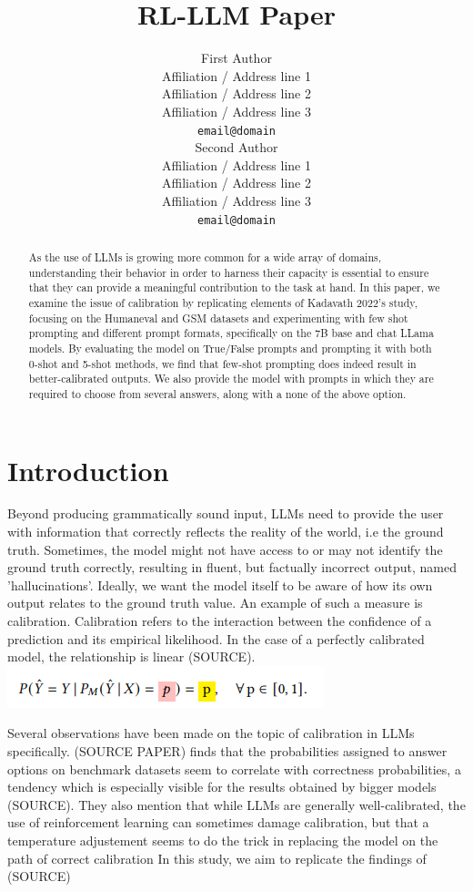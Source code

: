 \documentclass[11pt]{article}
\title{RL-LLM Paper}
\author{First Author \\
  Affiliation / Address line 1 \\
  Affiliation / Address line 2 \\
  Affiliation / Address line 3 \\
  \texttt{email@domain} \\\And
  Second Author \\
  Affiliation / Address line 1 \\
  Affiliation / Address line 2 \\
  Affiliation / Address line 3 \\
  \texttt{email@domain} \\}
\begin{document}
\maketitle
\begin{abstract}
As the use of LLMs is growing more common for a wide array of domains, understanding their behavior in order to harness their capacity is essential to ensure that they can provide a meaningful contribution to the task at hand. In this paper, we examine the issue of calibration by replicating elements of Kadavath 2022's study, focusing on the Humaneval and GSM datasets and experimenting with few shot prompting and different prompt formats, specifically on the 7B base and chat LLama models. By evaluating the model on True/False prompts and prompting it with both 0-shot and 5-shot methods, we find that few-shot prompting does indeed result in better-calibrated outputs. We also provide the model with prompts in which they are required to choose from several answers, along with a none of the above option.
\end{abstract}



\section{Introduction}

Beyond producing grammatically sound input, LLMs need to provide the user with information that correctly reflects the reality of the world, i.e the ground truth. Sometimes, the model might not have access to or may not identify the ground truth correctly, resulting in fluent, but factually incorrect output, named 'hallucinations'. Ideally, we want the model itself to be aware of how its own output relates to the ground truth value. An example of such a measure is calibration. Calibration refers to the interaction between the confidence of a prediction and its empirical likelihood. In the case of a perfectly calibrated model, the relationship is linear (SOURCE). 
\includegraphics{figures/calibration_formula.PNG}

Several observations have been made on the topic of calibration in LLMs specifically. (SOURCE PAPER) finds that the probabilities assigned to answer options on benchmark datasets seem to correlate with correctness probabilities, a tendency which is especially visible for the results obtained by bigger models (SOURCE). They also mention that while LLMs are generally well-calibrated, the use of reinforcement learning can sometimes damage calibration, but that a temperature adjustement seems to do the trick in replacing the model on the path of correct calibration
In this study, we aim to replicate the findings of (SOURCE)
\end{document}
